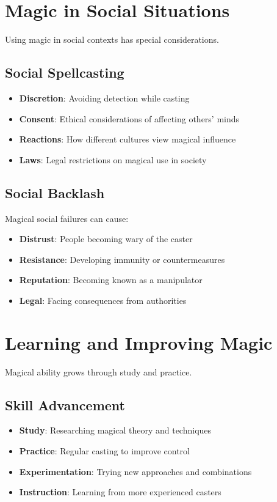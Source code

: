 \section{Magic in Social Situations} 

Using magic in social contexts has special considerations.

\subsection*{Social Spellcasting}
\begin{itemize}
\item \textbf{Discretion}: Avoiding detection while casting
\item \textbf{Consent}: Ethical considerations of affecting others' minds
\item \textbf{Reactions}: How different cultures view magical influence
\item \textbf{Laws}: Legal restrictions on magical use in society
\end{itemize}

\subsection*{Social Backlash}
Magical social failures can cause:
\begin{itemize}
\item \textbf{Distrust}: People becoming wary of the caster
\item \textbf{Resistance}: Developing immunity or countermeasures
\item \textbf{Reputation}: Becoming known as a manipulator
\item \textbf{Legal}: Facing consequences from authorities
\end{itemize}

\section{Learning and Improving Magic} 

Magical ability grows through study and practice.

\subsection*{Skill Advancement}
\begin{itemize}
\item \textbf{Study}: Researching magical theory and techniques
\item \textbf{Practice}: Regular casting to improve control
\item \textbf{Experimentation}: Trying new approaches and combinations
\item \textbf{Instruction}: Learning from more experienced casters
\end{itemize}

